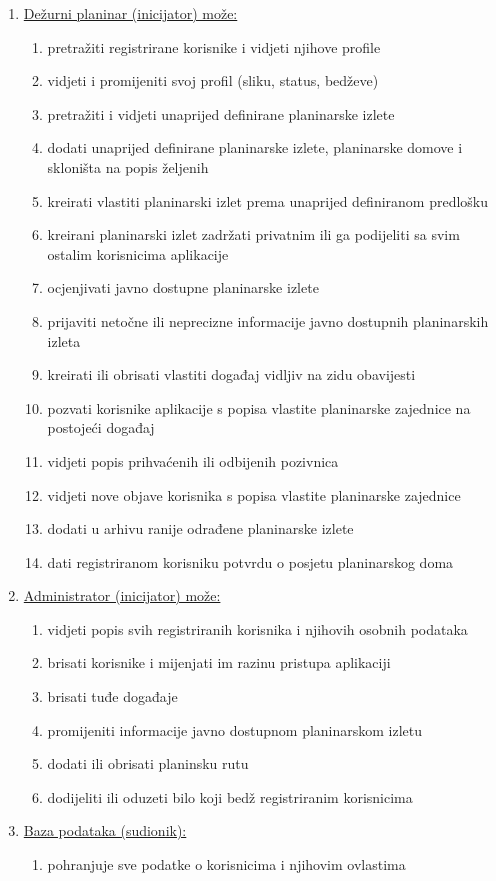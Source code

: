 \begin{enumerate}
\item \underline{Dežurni planinar (inicijator) može:}
\begin{enumerate}
\item pretražiti registrirane korisnike i vidjeti njihove profile
\item vidjeti i promijeniti svoj profil (sliku, status, bedževe)
\item pretražiti i vidjeti unaprijed definirane planinarske izlete
\item dodati unaprijed definirane planinarske izlete, planinarske domove i skloništa na popis željenih
\item kreirati vlastiti planinarski izlet prema unaprijed definiranom predlošku
\item kreirani planinarski izlet zadržati privatnim ili ga podijeliti sa svim ostalim korisnicima aplikacije
\item ocjenjivati javno dostupne planinarske izlete
\item prijaviti netočne ili neprecizne informacije javno dostupnih planinarskih izleta
\item kreirati ili obrisati vlastiti događaj vidljiv na zidu obavijesti
\item pozvati korisnike aplikacije s popisa vlastite planinarske zajednice na postojeći događaj
\item vidjeti popis prihvaćenih ili odbijenih pozivnica
\item vidjeti nove objave korisnika s popisa vlastite planinarske zajednice
\item dodati u arhivu ranije odrađene planinarske izlete
\item dati registriranom korisniku potvrdu o posjetu planinarskog doma
\end{enumerate}

\item \underline{Administrator (inicijator) može:}
\begin{enumerate}
\item vidjeti popis svih registriranih korisnika i njihovih osobnih podataka
\item brisati korisnike i mijenjati im razinu pristupa aplikaciji
\item brisati tuđe događaje
\item promijeniti informacije javno dostupnom planinarskom izletu
\item dodati ili obrisati planinsku rutu
\item dodijeliti ili oduzeti bilo koji bedž registriranim korisnicima
\end{enumerate}

\item \underline{Baza podataka (sudionik):}
\begin{enumerate}
\item pohranjuje sve podatke o korisnicima i njihovim ovlastima
\end{enumerate}

\end{enumerate}

